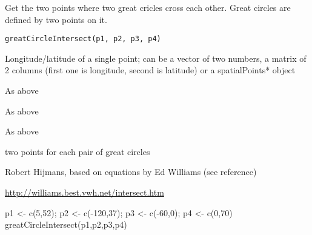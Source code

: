 \begin{Description}\relax
Get the two points where two great cricles cross each other. Great circles are defined by two points on it.
\end{Description}
\begin{Usage}
\begin{verbatim}
greatCircleIntersect(p1, p2, p3, p4) 
\end{verbatim}
\end{Usage}
\begin{Arguments}
\begin{ldescription}
\item[\code{p1}] Longitude/latitude of a single point; can be a vector of two numbers, a matrix of 2 columns (first one is longitude, second is latitude) or a spatialPoints* object
\item[\code{p2}] As above
\item[\code{p3}] As above
\item[\code{p4}] As above
\end{ldescription}
\end{Arguments}
\begin{Value}
two points for each pair of great circles
\end{Value}
\begin{Author}\relax
Robert Hijmans, based on equations by Ed Williams (see reference)
\end{Author}
\begin{References}\relax
\url{http://williams.best.vwh.net/intersect.htm}
\end{References}
\begin{Examples}
\begin{ExampleCode}
p1 <- c(5,52); p2 <- c(-120,37); p3 <- c(-60,0); p4 <- c(0,70)
greatCircleIntersect(p1,p2,p3,p4)
\end{ExampleCode}
\end{Examples}

